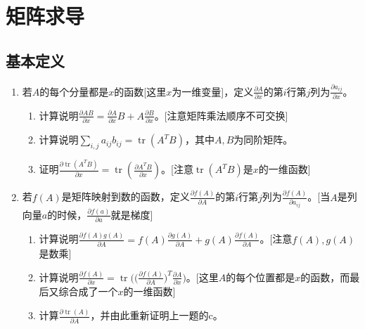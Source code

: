 \documentclass[a4paper,UTF8,fontset=windows]{ctexart}
\DeclareMathOperator*{\tr}{tr}
\begin{document}
\section{矩阵求导}
\subsection{基本定义}
\begin{enumerate}
    \item 若$A$的每个分量都是$x$的函数[这里$x$为一维变量]，定义$\frac{\partial A}{\partial x}$的第$i$行第$j$列为$\frac{\partial a_{ij}}{\partial x}$。
    \begin{enumerate}
        \item 计算说明$\frac{\partial AB}{\partial x}=\frac{\partial A}{\partial x}B+A\frac{\partial B}{\partial x}$。[注意矩阵乘法顺序不可交换]
        \item 计算说明$\sum_{i,j}a_{ij}b_{ij}=\tr(A^TB)$，其中$A,B$为同阶矩阵。
        \item 证明$\frac{\partial\tr(A^TB)}{\partial x}=\tr(\frac{\partial A^TB}{\partial x})$。[注意$\tr(A^TB)$是$x$的一维函数]
    \end{enumerate}

    \item 若$f(A)$是矩阵映射到数的函数，定义$\frac{\partial f(A)}{\partial A}$的第$i$行第$j$列为$\frac{\partial f(A)}{\partial a_{ij}}$。[当$A$是列向量$a$的时候，$\frac{\partial f(a)}{\partial a}$就是梯度]
    \begin{enumerate}
        \item 计算说明$\frac{\partial f(A)g(A)}{\partial A}=f(A)\frac{\partial g(A)}{\partial A}+g(A)\frac{\partial f(A)}{\partial A}$。[注意$f(A),g(A)$是数乘]
        \item 计算说明$\frac{\partial f(A)}{\partial x}=\tr\big(\big(\frac{\partial f(A)}{\partial A}\big)^T\frac{\partial A}{\partial x}\big)$。[这里$A$的每个位置都是$x$的函数，而最后又综合成了一个$x$的一维函数]
        \item 计算$\frac{\partial \tr(A)}{\partial A}$，并由此重新证明上一题的c。
    \end{enumerate}
\end{enumerate}
\end{document}
